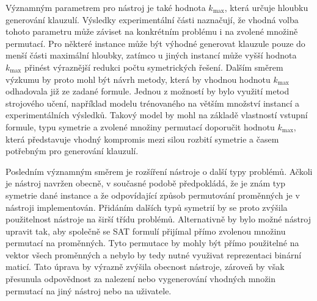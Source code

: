 Významným parametrem pro nástroj je také hodnota $k_{\max}$, která určuje hloubku
generování klauzulí. Výsledky experimentální části naznačují, že vhodná volba
tohoto parametru může záviset na konkrétním problému i na zvolené množině
permutací. Pro některé instance může být výhodné generovat klauzule pouze do
menší části maximální hloubky, zatímco u jiných instancí může vyšší hodnota
$k_{\max}$ přinést výraznější redukci počtu symetrických řešení. Dalším směrem
výzkumu by proto mohl být návrh metody, která by vhodnou hodnotu $k_{\max}$
odhadovala již ze zadané formule. Jednou z možností by bylo využití metod
strojového učení, například modelu trénovaného na větším množství instancí a
experimentálních výsledků. Takový model by mohl na základě vlastností vstupní
formule, typu symetrie a zvolené množiny permutací doporučit hodnotu $k_{\max}$,
která představuje vhodný kompromis mezi silou rozbití symetrie a časem potřebným
pro generování klauzulí.

Posledním významným směrem je rozšíření nástroje o další typy problémů.
Ačkoli je nástroj navržen obecně, v současné podobě předpokládá, že je znám typ
symetrie dané instance a že odpovídající způsob permutování proměnných je v
nástroji implementován. Přidáním dalších typů symetrií by se proto zvýšila
použitelnost nástroje na širší třídu problémů. Alternativně by bylo možné nástroj
upravit tak, aby společně se SAT formulí přijímal přímo zvolenou množinu permutací
na proměnných. Tyto permutace by mohly být přímo použitelné na vektor všech proměnných a nebylo by tedy nutné využivat reprezentaci binární maticí. Tato úprava by výrazně zvýšila obecnost nástroje,
zároveň by však přesunula odpovědnost za nalezení nebo vygenerování vhodných
množin permutací na jiný nástroj nebo na uživatele.